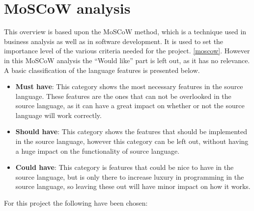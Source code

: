 \section{MoSCoW analysis}
This overview is based upon the MoSCoW method, which is a technique used in business analysis as well as in software development. It is used to set the importance level of the various criteria needed for the project. \ref{moscow}. However in this MoSCoW analysis the ``Would like'' part is left out, as it has no relevance. \\

A basic classification of the language features is presented below.
\begin{itemize}
\item \textbf{Must have}: This category shows the most necessary features in the source language. These features are the ones that can not be overlooked in the source language, as it can have a great impact on whether or not the source language will
work correctly. 

\item \textbf{Should have}: This category shows the features that should be implemented in the source language, however this category can be left out, without having a huge impact on the functionality of source language. 

\item \textbf{Could have}: This category is features that could be nice to have in the source language, but is only there to increase luxury in programming in the source language, so leaving these out will have minor impact on how it works. 
\end{itemize}


For this project the following have been chosen:\\

